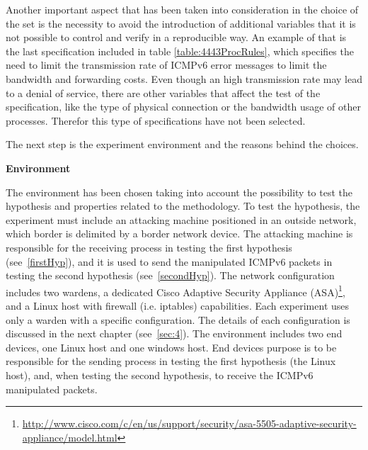 \documentclass[12pt]{article}
\begin{document}
Another important aspect that has been taken into consideration in the choice of the set is the necessity to avoid the introduction of additional variables that it is not possible to control and verify in a reproducible way. An example of that is the last specification included in table \ref{table:4443ProcRules}, which specifies the need to limit the transmission rate of ICMPv6 error messages to limit the bandwidth and forwarding costs. Even though an high transmission rate may lead to a denial of service, there are other variables that affect the test of the specification, like the type of physical connection or the bandwidth usage of other processes. Therefor this type of specifications have not been selected.

The next step is the experiment environment and the reasons behind the choices.

\textbf{Environment}
\label{subsub:enviroment}

The environment has been chosen taking into account the possibility to test the hypothesis and properties related to the methodology. To test the hypothesis, the experiment must include an attacking machine positioned in an outside network, which border is delimited by a border network device. The attacking machine is responsible for the receiving process in testing the first hypothesis (see~\ref{firstHyp}), and it is used to send the manipulated ICMPv6 packets in testing the second hypothesis (see~\ref{secondHyp}). The network configuration includes two wardens, a dedicated Cisco Adaptive Security Appliance (ASA)\footnote{\url{http://www.cisco.com/c/en/us/support/security/asa-5505-adaptive-security-appliance/model.html}}, and a Linux host with firewall (i.e. iptables) capabilities. Each experiment uses only a warden with a specific configuration. The details of each configuration is discussed in the next chapter (see~\ref{sec:4}). The environment includes two end devices, one Linux host and one windows host. End devices purpose is to be responsible for the sending process in testing the first hypothesis (the Linux host), and, when testing the second hypothesis, to receive the ICMPv6 manipulated packets.
\end{document}
